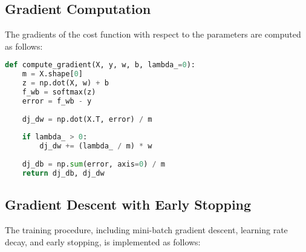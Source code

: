 \documentclass[10pt,journal,compsoc]{IEEEtran}
\begin{document}
\subsection{Gradient Computation}
The gradients of the cost function with respect to the parameters are computed as follows:

\begin{lstlisting}[language=Python]
def compute_gradient(X, y, w, b, lambda_=0):
    m = X.shape[0]
    z = np.dot(X, w) + b
    f_wb = softmax(z)
    error = f_wb - y
    
    dj_dw = np.dot(X.T, error) / m
    
    if lambda_ > 0:
        dj_dw += (lambda_ / m) * w
        
    dj_db = np.sum(error, axis=0) / m
    return dj_db, dj_dw
\end{lstlisting}

\subsection{Gradient Descent with Early Stopping}
The training procedure, including mini-batch gradient descent, learning rate decay, and early stopping, is implemented as follows:
\end{document}

